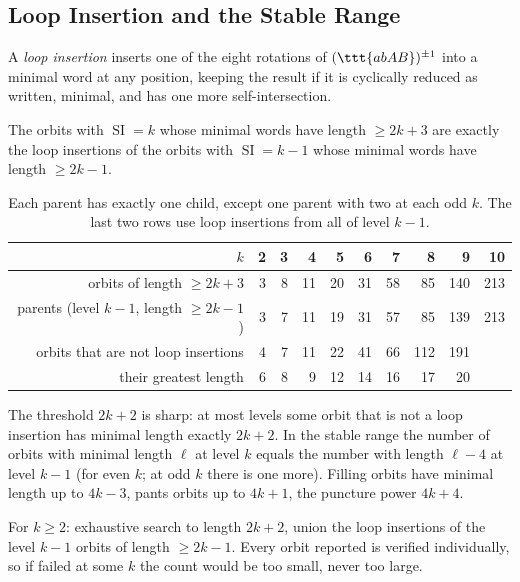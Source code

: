 \documentclass[10pt]{article}
\begin{document}
\subsection{Loop Insertion and the Stable Range}

A \emph{loop insertion} inserts one of the eight rotations of $(\ttt{abAB})^{\pm 1}$ into a minimal word at any position, keeping the result if it is cyclically reduced as written, minimal, and has one more self-intersection.

\begin{claim}\label{claim:loop}
	The orbits with $\operatorname{SI} = k$ whose minimal words have length $\geq 2k+3$ are exactly the loop insertions of the orbits with $\operatorname{SI} = k-1$ whose minimal words have length $\geq 2k-1$.
\end{claim}

\begin{table}[H]
	\centering
	\begin{tabular}{r|rrrrrrrrr}
		\toprule
		$k$ & 2 & 3 & 4 & 5 & 6 & 7 & 8 & 9 & 10 \\
		\midrule
		orbits of length $\geq 2k+3$ & 3 & 8 & 11 & 20 & 31 & 58 & 85 & 140 & 213 \\
		parents (level $k-1$, length $\geq 2k-1$) & 3 & 7 & 11 & 19 & 31 & 57 & 85 & 139 & 213 \\
		orbits that are not loop insertions & 4 & 7 & 11 & 22 & 41 & 66 & 112 & 191 & \\
		their greatest length & 6 & 8 & 9 & 12 & 14 & 16 & 17 & 20 & \\
		\bottomrule
	\end{tabular}
	\caption{Each parent has exactly one child, except one parent with two at each odd $k$. The last two rows use loop insertions from all of level $k-1$.}
\end{table}

\begin{rmk}
	The threshold $2k+2$ is sharp: at most levels some orbit that is not a loop insertion has minimal length exactly $2k+2$.
	In the stable range the number of orbits with minimal length $\ell$ at level $k$ equals the number with length $\ell - 4$ at level $k-1$ (for even $k$; at odd $k$ there is one more).
	Filling orbits have minimal length up to $4k-3$, pants orbits up to $4k+1$, the puncture power $4k+4$.
\end{rmk}

\begin{algo}
	For $k \geq 2$: exhaustive search to length $2k+2$, union the loop insertions of the level $k-1$ orbits of length $\geq 2k-1$.
	Every orbit reported is verified individually, so if  failed at some $k$ the count would be too small, never too large.
\end{algo}
\end{document}

